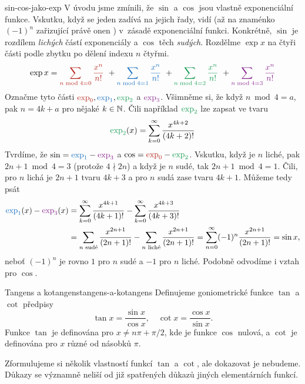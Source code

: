 \begin{remark}{}{sin-cos-jako-exp}
 V úvodu jsme zmínili, že $\sin$ a $\cos$ jsou vlastně exponenciální funkce.
 Vskutku, když se jeden zadívá na jejich řady, vidí (až na znaménko $(-1)^{n}$
 zařizující právě onen ) v~zásadě exponenciální funkci.
 Konkrétně, $\sin$ je rozdílem \emph{lichých} částí exponenciály a $\cos$ těch
 \emph{sudých}. Rozdělme $\exp x$ na čtyři části podle zbytku po dělení indexu
 $n$ čtyřmi.
 \[
  \exp x = \clr{\sum_{n \bmod 4 = 0} \frac{x^{n}}{n!}}~+ \clb{\sum_{n \bmod 4 =
  1} \frac{x^{n}}{n!}}~+\clg{\sum_{n \bmod 4 = 2} \frac{x^{n}}{n!}}~+\clm{\sum_{n \bmod 4 =
  3} \frac{x^{n}}{n!}}
 \]
 Označme tyto části $\clr{\exp_0}, \clb{\exp_1}, \clg{\exp_2}$ a $\clm{\exp_3}$.
 Všimněme si, že když $n \bmod 4 = a$, pak $n = 4k + a$ pro nějaké $k \in \mathbb{N}$.
 Čili například $\clg{\exp_2}$ lze zapsat ve tvaru
 \[
  \clg{\exp_2}(x) = \sum_{k=0}^{\infty} \frac{x^{4k + 2}}{(4k + 2)!}
 \]
 Tvrdíme, že $\sin = \clb{\exp_1} - \clm{\exp_3}$ a $\cos = \clr{\exp_0} -
 \clg{\exp_2}$. Vskutku, když je $n$ liché, pak $2n+1 \bmod 4 = 3$ (protože $4
 \nmid 2n$) a když je $n$ sudé, tak $2n + 1 \bmod 4 = 1$. Čili, pro $n$ lichá je
 $2n + 1$ tvaru $4k+3$ a pro $n$ sudá zase tvaru $4k+1$. Můžeme tedy psát
 \begin{align*}
  \clb{\exp_1}(x) - \clm{\exp_3}(x) &= \sum_{k=0}^{\infty}
  \frac{x^{4k+1}}{(4k+1)!} - \sum_{k=0}^{\infty} \frac{x^{4k+3}}{(4k+3)!}\\
                                    &=\sum_{n \text{ sudé}}
                                    \frac{x^{2n+1}}{(2n+1)!} - \sum_{n \text{
                                    liché}} \frac{x^{2n+1}}{(2n+1)!} =
                                    \sum_{n=0}^{\infty}
                                    (-1)^{n}\frac{x^{2n+1}}{(2n+1)!} = \sin x,
 \end{align*}
 neboť $(-1)^{n}$ je rovno $1$ pro $n$ sudé a $-1$ pro $n$ liché. Podobně
 odvodíme i vztah pro $\cos$.
\end{remark}

\begin{definition}{Tangens a kotangens}{tangens-a-kotangens}
 Definujeme goniometrické funkce $\tan$ a $\cot$ předpisy
 \[
  \tan x = \frac{\sin x}{\cos x}, \quad \cot x = \frac{\cos x}{\sin x}.
 \]
 Funkce $\tan$ je definována pro $x \neq n\pi + \pi / 2$, kde je funkce
 $\cos$ nulová, a $\cot$ je definována pro $x$ různé od násobků $\pi$.
\end{definition}

Zformulujeme si několik vlastností funkcí $\tan$ a $\cot$, ale dokazovat je
nebudeme. Důkazy se významně neliší od již spatřených důkazů jiných
elementárních funkcí.

